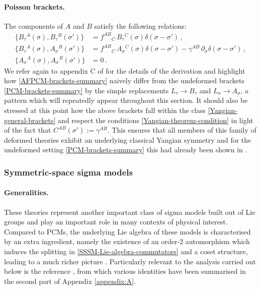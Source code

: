 \documentclass[12pt]{article}
\numberwithin{equation}{section}
\begin{document}
\paragraph{Poisson brackets.} The components of $A$ and $B$ satisfy the following relations:
\begin{equation}\label{AFPCM-brackets-summary}
\begin{aligned}
\{ B_{\tau}{}^{A}(\sigma),B_{\tau}{}^{B}(\sigma') \} &= f^{AB}{}_{C} \, B_{\tau}{}^{C}(\sigma)\delta(\sigma-\sigma') \, ,
\\
\{ B_{\tau}{}^{A}(\sigma),A_{\sigma}{}^{B}(\sigma') \} &= f^{AB}{}_{C} \, A_{\sigma}{}^{C}(\sigma)\delta(\sigma-\sigma')-\gamma^{AB} \, \partial_{\sigma}\delta(\sigma-\sigma') \, ,
\\
\{ A_{\sigma}{}^{A}(\sigma),A_{\sigma}{}^{B}(\sigma') \} &= 0 \, .
\end{aligned}
\end{equation}
We refer again to appendix C of \cite{Bielli:2024ach} for the details of the derivation and highlight how \eqref{AFPCM-brackets-summary} naively differ from the undeformed brackets \eqref{PCM-brackets-summary} by the simple replacements $L_{\tau}\rightarrow B_{\tau}$ and $L_{\sigma}\rightarrow A_{\sigma}$, a pattern which will repeatedly appear throughout this section. It should also be stressed at this point how the above brackets fall within the class \eqref{Yangian-general-brackets} and respect the conditions \eqref{Yangian-theorem-condition} in light of the fact that $C^{AB}(\sigma'):=\gamma^{AB}$. This ensures that all members of this family of deformed theories exhibit an underlying classical Yangian symmetry and for the undeformed setting \eqref{PCM-brackets-summary} this had already been shown in \cite{MacKay:1992he}.



\subsubsection{Symmetric-space sigma models}\label{subsubsec:SSSM}

\paragraph{Generalities.} These theories represent another important class of sigma models built out of Lie groups and play an important role in many contexts of physical interest. Compared to PCMs, the underlying Lie algebra of these models is characterised by an extra ingredient, namely the existence of an order-2 automorphism which induces the splitting in \eqref{SSSM-Lie-algebra-commutators} and a coset structure, leading to a much richer picture \cite{Eichenherr:1979ci,Eichenherr:1979hz,Forger:1991cm,Forger:1991ty,Laartz:1992rw,Forger:1992kn}. Particularly relevant to the analysis carried out below is the reference \cite{Forger:1991cm}, from which various identities have been summarised in the second part of Appendix \ref{appendix:A}.
\end{document}
